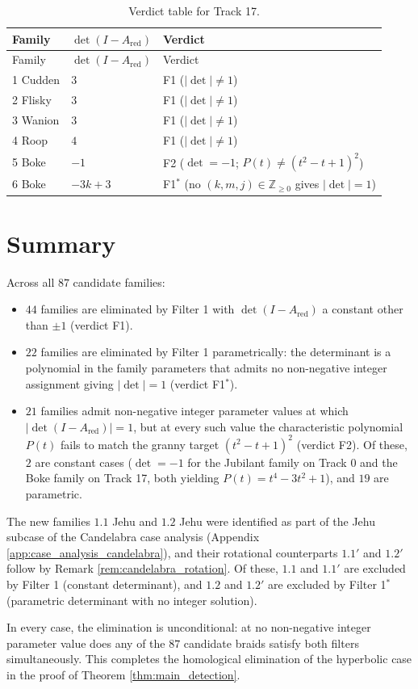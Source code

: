 \begin{longtable}{@{}l l >{\raggedright\arraybackslash}p{}@{}}
\caption{Verdict table for Track 17.}\\
\toprule
Family & $\det(I-A_{\text{red}})$ & Verdict \\
\midrule
\endfirsthead
\toprule
Family & $\det(I-A_{\text{red}})$ & Verdict \\
\midrule
\endhead
1 Cudden & $3$ & F1 ($|\det| \neq 1$) \\
2 Flisky & $3$ & F1 ($|\det| \neq 1$) \\
3 Wanion & $3$ & F1 ($|\det| \neq 1$) \\
4 Roop & $4$ & F1 ($|\det| \neq 1$) \\
5 Boke & $-1$ & F2 ($\det = -1$; $P(t) \neq (t^2-t+1)^2$) \\
6 Boke & $-3k+3$ & F1$^{*}$ (no $(k,m,j) \in \mathbb{Z}_{\ge 0}$ gives $|\det|=1$) \\
\bottomrule
\end{longtable}

\section{Summary}

Across all $87$ candidate families:
\begin{itemize}
    \item $44$ families are eliminated by Filter 1 with $\det(I-A_{\text{red}})$ a constant other than $\pm 1$ (verdict F1).
    \item $22$ families are eliminated by Filter 1 parametrically: the determinant is a polynomial in the family parameters that admits no non-negative integer assignment giving $|\det| = 1$ (verdict F1$^{*}$).
    \item $21$ families admit non-negative integer parameter values at which $|\det(I-A_{\text{red}})| = 1$, but at every such value the characteristic polynomial $P(t)$ fails to match the granny target $(t^2-t+1)^2$ (verdict F2). Of these, $2$ are constant cases ($\det = -1$ for the Jubilant family on Track 0 and the Boke family on Track 17, both yielding $P(t) = t^4 - 3t^2 + 1$), and $19$ are parametric.
\end{itemize}

The new families $1.1$ Jehu and $1.2$ Jehu were identified as part of the Jehu subcase of the Candelabra case analysis (Appendix \ref{app:case_analysis_candelabra}), and their rotational counterparts $1.1'$ and $1.2'$ follow by Remark \ref{rem:candelabra_rotation}. Of these, $1.1$ and $1.1'$ are excluded by Filter 1 (constant determinant), and $1.2$ and $1.2'$ are excluded by Filter 1$^{*}$ (parametric determinant with no integer solution).

In every case, the elimination is unconditional: at no non-negative integer parameter value does any of the $87$ candidate braids satisfy both filters simultaneously. This completes the homological elimination of the hyperbolic case in the proof of Theorem \ref{thm:main_detection}.